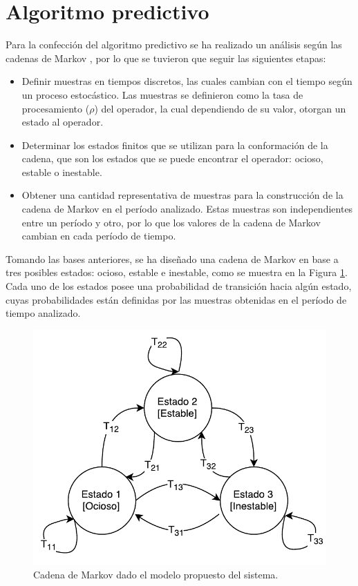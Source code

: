 \section{Algoritmo predictivo}
Para la confección del algoritmo predictivo se ha realizado un análisis según las cadenas de Markov \citep{ching2006markov}, por lo que se tuvieron que seguir las siguientes etapas:

\begin{itemize}
	\item Definir muestras en tiempos discretos, las cuales cambian con el tiempo según un proceso estocástico. Las muestras se definieron como la tasa de procesamiento ($\rho$) del operador, la cual dependiendo de su valor, otorgan un estado al operador.
	\item Determinar los estados finitos que se utilizan para la conformación de la cadena, que son los estados que se puede encontrar el operador: ocioso, estable o inestable.
	\item Obtener una cantidad representativa de muestras para la construcción de la cadena de Markov en el período analizado. Estas muestras son independientes entre un período y otro, por lo que los valores de la cadena de Markov cambian en cada período de tiempo. %
\end{itemize}

Tomando las bases anteriores, se ha diseñado una cadena de Markov en base a tres posibles estados: ocioso, estable e inestable, como se muestra en la Figura \ref{fig:cadenaMarkovPredictiva}. Cada uno de los estados posee una probabilidad de transición hacia algún estado, cuyas probabilidades están definidas por las muestras obtenidas en el período de tiempo analizado.

\begin{figure}[ht!]
  \centering
    \includegraphics[scale=0.75]{images/CadenaMarkovPredictiva.pdf}
  \caption{Cadena de Markov dado el modelo propuesto del sistema.}
  \label{fig:cadenaMarkovPredictiva}
\end{figure}

